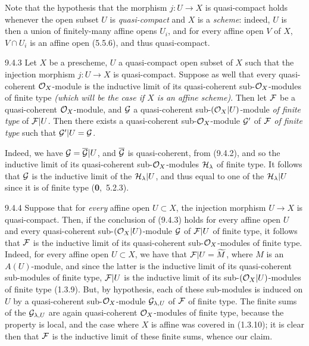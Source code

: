 \documentclass[../main.tex]{subfiles}
\begin{document}
 Note that the hypothesis that the morphism $j\colon U\to X$ is quasi-compact holds whenever the open subset $U$ is \emph{quasi-compact} and $X$ is a \emph{scheme}: indeed, $U$ is then a union of finitely-many affine opens $U_i$, and for every affine open $V$ of $X$, $V\cap U_i$ is an affine open (5.5.6), and thus quasi-compact.
 
 \begin{env}[Corollary]{9.4.3}
     Let $X$ be a prescheme, $U$ a quasi-compact open subset of $X$ such that the injection morphism $j\colon U\to X$ is quasi-compact.
     Suppose as well that every quasi-coherent $\mathcal{O}_X$-module is the inductive limit of its quasi-coherent sub-$\mathcal{O}_X$-modules of finite type \emph{(which will be the case if $X$ is an \emph{affine scheme})}.
     Then let $\mathcal{F}$ be a quasi-coherent $\mathcal{O}_X$-module, and $\mathcal{G}$ a quasi-coherent sub-$(\mathcal{O}_X|U)$-module \emph{of finite type} of $\mathcal{F}|U$.
     Then there exists a quasi-coherent sub-$\mathcal{O}_X$-module $\mathcal{G}'$ of $\mathcal{F}$ \emph{of finite type} such that $\mathcal{G}'|U=\mathcal{G}$.
 \end{env}
 
 Indeed, we have $\mathcal{G}=\overline{\mathcal{G}}|U$, and $\overline{\mathcal{G}}$ is quasi-coherent, from (9.4.2), and so the inductive limit of its quasi-coherent sub-$\mathcal{O}_X$-modules $\mathcal{H}_\lambda$ of finite type.
 It follows that $\mathcal{G}$ is the inductive limit of the $\mathcal{H}_\lambda|U$, and thus equal to one of the $\mathcal{H}_\lambda|U$ since it is of finite type (\textbf{0},~5.2.3).
 
 \begin{env}[Remark]{9.4.4}
     Suppose that for \emph{every} affine open $U\subset X$, the injection morphism $U\to X$ is quasi-compact.
     Then, if the conclusion of (9.4.3) holds for every affine open $U$ and every quasi-coherent sub-$(\mathcal{O}_X|U)$-module $\mathcal{G}$ of $\mathcal{F}|U$ of finite type, it follows that $\mathcal{F}$ is the inductive limit of its quasi-coherent sub-$\mathcal{O}_X$-modules of finite type.
     Indeed, for every affine open $U\subset X$, we have that $\mathcal{F}|U=\widetilde{M}$, where $M$ is an $A(U)$-module, and since the latter is the inductive limit of its quasi-coherent sub-modules of finite type, $\mathcal{F}|U$ is the inductive limit of its sub-$(\mathcal{O}_X|U)$-modules of finite type (1.3.9).
     But, by hypothesis, each of these sub-modules is induced on $U$ by a quasi-coherent sub-$\mathcal{O}_X$-module $\mathcal{G}_{\lambda,U}$ of $\mathcal{F}$ of finite type.
     The finite sums of the $\mathcal{G}_{\lambda,U}$ are again quasi-coherent $\mathcal{O}_X$-modules of finite type, because the property is local, and the case where $X$ is affine was covered in (1.3.10); it is clear then that $\mathcal{F}$ is the inductive limit of these finite sums, whence our claim.
 \end{env}
 
\end{document}
